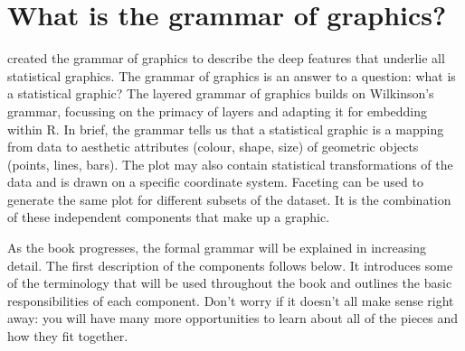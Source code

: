 
\section{What is the grammar of graphics?}

\citet{wilkinson:2006} created the grammar of graphics to describe the deep features that underlie all statistical graphics.  The grammar of graphics is an answer to a question: what is a statistical graphic?  The layered grammar of graphics \citep{wickham:2007d} builds on Wilkinson's grammar, focussing on the primacy of layers and adapting it for embedding within R.  In brief, the grammar tells us that a statistical graphic is a mapping from data to  aesthetic attributes (colour, shape, size) of geometric objects (points, lines, bars).  The plot may also contain statistical transformations of the data and is drawn on a specific coordinate system.  Faceting can be used to generate the same plot for different subsets of the dataset.  It is the combination of these independent components that make up a graphic.  

As the book progresses, the formal grammar will be explained in increasing detail. The first description of the components follows below. It introduces some of the terminology that will be used throughout the book and outlines the basic responsibilities of each component.  Don't worry if it doesn't all make sense right away: you will have many more opportunities to learn about all of the pieces and how they fit together.

